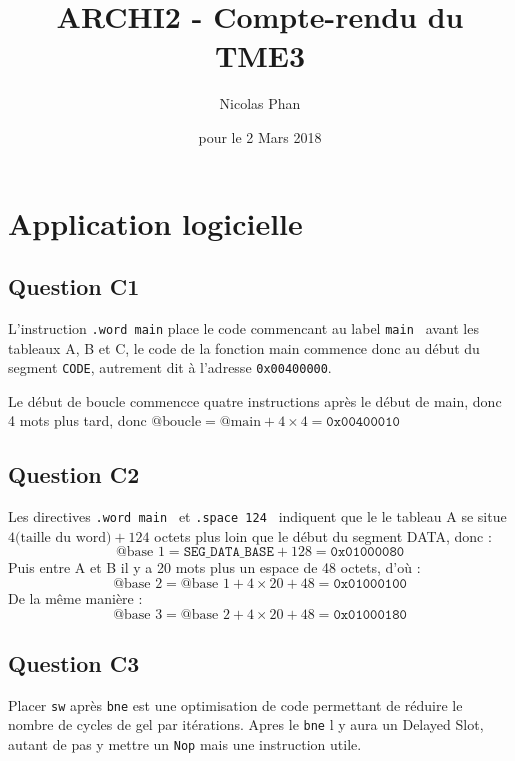 \documentclass{article}
\title{ARCHI2 - Compte-rendu du TME3}
\author{Nicolas Phan}
\date{pour le 2 Mars 2018}
\begin{document}
\pagestyle{headings}
\maketitle
\tableofcontents
\newpage


\section{Application logicielle}

\subsection{Question C1}

L'instruction \texttt{.word main} place le code commencant au label \texttt{main
} avant les tableaux A, B et C, le code de la fonction main commence
donc au début du segment \texttt{CODE}, autrement dit à l'adresse \texttt{0x00400000}.  

Le début de boucle commencce quatre instructions après le début de main,
donc 4 mots plus tard, donc $\text{@boucle} = \text{@main} + 4 \times 4 = \texttt{0x00400010}$

\subsection{Question C2}

Les directives \texttt{.word main } et \texttt{.space 124 } indiquent que le le tableau A se situe
$4 \text{(taille du word)} + 124$ octets plus loin que le début du segment DATA, donc :
\[ \text{@base 1} = \texttt{SEG\_DATA\_BASE} + 128 = \texttt{0x01000080} \]
Puis entre A et B il y a 20 mots plus un espace de 48 octets, d'où :
\[ \text{@base 2} = \text{@base 1} + 4 \times 20 + 48 = \texttt{0x01000100} \]
De la même manière :
\[ \text{@base 3} = \text{@base 2} + 4 \times 20 + 48 = \texttt{0x01000180} \]

\subsection{Question C3}

Placer \texttt{sw} après \texttt{bne} est une optimisation de code permettant de réduire le nombre
de cycles de gel par itérations.
Apres le \texttt{bne}  l y aura un Delayed Slot, autant de pas y mettre un \texttt{Nop}  mais
une instruction utile.
\end{document}
